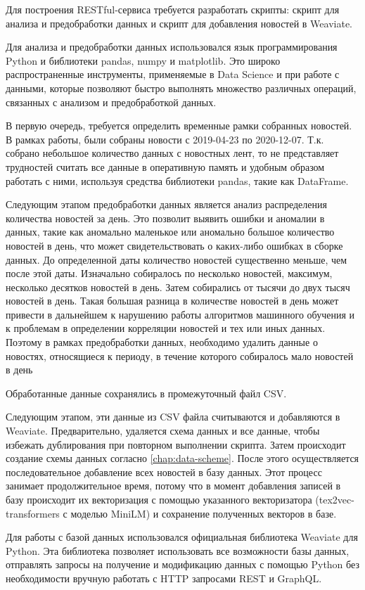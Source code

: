 Для построения RESTful-сервиса требуется разработать скрипты: скрипт для анализа и предобработки данных и скрипт для добавления новостей в Weaviate.

Для анализа и предобработки данных использовался язык программирования Python и библиотеки pandas, numpy и matplotlib. Это широко распространенные инструменты, применяемые в Data Science и при работе с данными, которые позволяют быстро выполнять множество различных операций, связанных с анализом и предобработкой данных.

В первую очередь, требуется определить временные рамки собранных новостей. В рамках работы, были собраны новости с 2019-04-23 по 2020-12-07. Т.к. собрано небольшое количество данных с новостных лент, то не представляет трудностей считать все данные в оперативную память и удобным образом работать с ними, используя средства библиотеки pandas, такие как DataFrame.

Следующим этапом предобработки данных является анализ распределения количества новостей за день. Это позволит выявить ошибки и аномалии в данных, такие как аномально маленькое или аномально большое количество новостей в день, что может свидетельствовать о каких-либо ошибках в сборке данных. До определенной даты количество новостей существенно меньше, чем после этой даты. Изначально собиралось по несколько новостей, максимум, несколько десятков новостей в день. Затем собирались от тысячи до двух тысяч новостей в день. Такая большая разница в количестве новостей в день может привести в дальнейшем к нарушению работы алгоритмов машинного обучения и к проблемам в определении корреляции новостей и тех или иных данных. Поэтому в рамках предобработки данных, необходимо удалить данные о новостях, относящиеся к периоду, в течение которого собиралось мало новостей в день

Обработанные данные сохранялись в промежуточный файл CSV.

Следующим этапом, эти данные из CSV файла считываются и добавляются в Weaviate. Предварительно, удаляется схема данных и все данные, чтобы избежать дублирования при повторном выполнении скрипта. Затем происходит создание схемы данных согласно \ref{chap:data-scheme}. После этого осуществляется последовательное добавление всех новостей в базу данных. Этот процесс занимает продолжительное время, потому что в момент добавления записей в базу происходит их векторизация с помощью указанного векторизатора (tex2vec-transformers с моделью MiniLM) и сохранение полученных векторов в базе.

Для работы с базой данных использовался официальная библиотека Weaviate для Python. Эта библиотека позволяет использовать все возможности базы данных, отправлять запросы на получение и модификацию данных с помощью Python без необходимости вручную работать с HTTP запросами REST и GraphQL.

